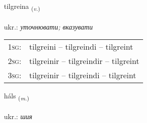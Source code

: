 \documentclass[frontgrid, backgrid]{flacards}\usepackage[]{graphicx}\usepackage[]{xcolor}
\begin{document}
\renewcommand{\flhead}{\vskip5pt \fboxsep=0pt {\small\bfseries\footnotesize Sagnorð | дієслово}}
\renewcommand{\fcfoot}{\vskip5pt \fboxsep=0pt \hspace{2pt}{\small\bfseries\footnotesize 2K}}

\renewcommand{\blhead}{\vskip5pt {\small\bfseries\footnotesize Sagnorð | дієслово }}
\renewcommand{\bcfoot}{\vskip5pt \hspace{2pt}{\small\bfseries\footnotesize 2K}}


{tilgreina \small{\textsubscript{(\textit{v.})}} \\[1ex] %
\textphonetic{[tʰɪlkreina]} \\
ukr.: \emph{уточнювати; вказувати} \\  [2ex]
\renewcommand*{\arraystretch}{0.8}
\begin{tabular}{p{1cm}l}
\textsc{1sg}: & tilgreini -- tilgreindi -- tilgreint \\ 
\textsc{2sg}: & tilgreinir -- tilgreindir -- tilgreint \\ 
\textsc{3sg}: & tilgreinir -- tilgreindi -- tilgreint \\ 
\end{tabular}
}

\renewcommand{\flhead}{\vskip5pt \fboxsep=0pt {\small\bfseries\footnotesize Nafnorð | іменник}}
\renewcommand{\fcfoot}{\vskip5pt \fboxsep=0pt \hspace{2pt}{\small\bfseries\footnotesize 2K}}

\renewcommand{\blhead}{\vskip5pt {\small\bfseries\footnotesize Nafnorð | іменник }}
\renewcommand{\bcfoot}{\vskip5pt \hspace{2pt}{\small\bfseries\footnotesize 2K}}


{háls \small{\textsubscript{(\textit{m.})}} \\[1ex] %
\textphonetic{[hauls]} \\
ukr.: \emph{шия} \\  [2ex]
\renewcommand*{\arraystretch}{0.8}
}
\end{document}
